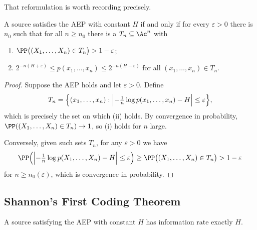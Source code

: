 That reformulation is worth recording precisely.

\begin{lemma}\label{lem:typical}
	A source satisfies the AEP with constant $H$ if and only if for every $\varepsilon>0$ there is $n_0$ such that for all $n \ge n_0$ there is a  $T_n \subseteq \Ac^n$ with
	\begin{enumerate}[label=(\roman*)]
		\item $\PP\bigl((X_1,\dots,X_n) \in T_n\bigr) > 1-\varepsilon$;
		\item $2^{-n(H+\varepsilon)} \le p(x_1,\dots,x_n) \le 2^{-n(H-\varepsilon)}$ for all $(x_1,\dots,x_n) \in T_n$.
	\end{enumerate}
\end{lemma}

\begin{proof}
	Suppose the AEP holds and let $\varepsilon>0$. Define
	$$T_n = \Bigl\{(x_1,\dots,x_n) : \Bigl\lvert-\tfrac1n \log p(x_1,\dots,x_n) - H\Bigr\rvert \le \varepsilon\Bigr\},$$
	which is precisely the set on which (ii) holds. By convergence in probability, $\PP((X_1,\dots,X_n)\in T_n) \to 1$, so (i) holds for $n$ large.

	Conversely, given such sets $T_n$, for any $\varepsilon > 0$ we have
	$$\PP\Bigl(\Bigl\lvert-\tfrac1n\log p(X_1,\dots,X_n)-H\Bigr\rvert \le \varepsilon\Bigr) \ge \PP\bigl((X_1,\dots,X_n)\in T_n\bigr) > 1-\varepsilon$$
	for $n \ge n_0(\varepsilon)$, which is convergence in probability.
\end{proof}

\subsection{Shannon's First Coding Theorem}

\begin{theorem}\label{thm:firstcoding}
	A source satisfying the AEP with constant $H$ has information rate exactly $H$.
\end{theorem}

